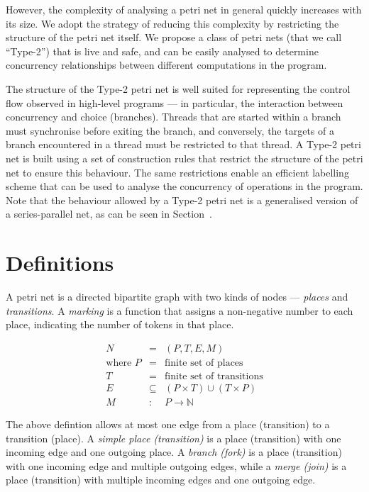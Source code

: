 \documentclass[12pt,a4paper]{article}
\begin{document}
However, the complexity of analysing a petri net in general quickly
increases with its size. We adopt the strategy of reducing this
complexity by restricting the structure of the petri net itself. We
propose a class of petri nets (that we call ``Type-2'') that is live
and safe, and can be easily analysed to determine concurrency
relationships between different computations in the program.

The structure of the Type-2 petri net is well suited for representing
the control flow observed in high-level programs --- in particular,
the interaction between concurrency and choice (branches). Threads
that are started within a branch must synchronise before exiting the
branch, and conversely, the targets of a branch encountered in a
thread must be restricted to that thread. A Type-2 petri net is built
using a set of construction rules that restrict the structure of the
petri net to ensure this behaviour. The same restrictions enable an
efficient labelling scheme that can be used to analyse the concurrency
of operations in the program. Note that the behaviour allowed by a
Type-2 petri net is a generalised version of a series-parallel
net\cite{something}, as can be seen in Section~\cite{sec:somewhere}.

\section{Definitions}
\label{sec:defintions}

A petri net is a directed bipartite graph with two kinds of nodes ---
\textit{places} and \textit{transitions}. A \textit{marking} is a
function that assigns a non-negative number to each place, indicating
the number of tokens in that place.

\begin{eqnarray*}
  N & = & (P, T, E, M)\\
  \textrm{where } P & = & \textrm{finite set of places}\\
  T & = & \textrm{finite set of transitions}\\
  E & \subseteq & (P \times T) \cup (T \times P)\\
  M & : & P \rightarrow \mathbb{N}
\end{eqnarray*}

The above defintion allows at most one edge from a place (transition)
to a transition (place). A \textit{simple place (transition)} is a
place (transition) with one incoming edge and one outgoing place. A
\textit{branch (fork)} is a place (transition) with one incoming edge
and multiple outgoing edges, while a \textit{merge (join)} is a place
(transition) with multiple incoming edges and one outgoing edge.
\end{document}
